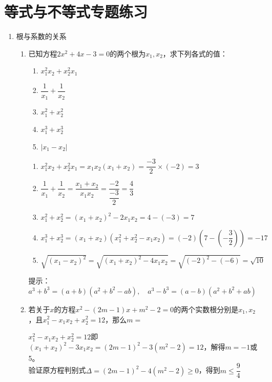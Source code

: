 \chapter*{等式与不等式专题练习}
\begin{enumerate}
    \item 根与系数的关系
    \begin{enumerate}
        \item 已知方程$2x^2+4x-3=0$的两个根为$x_1, x_2$，求下列各式的值：
        \begin{enumerate}
            \item $x_1^2x_2 + x_2^2x_1$
            \item $\dfrac{1}{x_1} + \dfrac{1}{x_2}$
            \item $x_1^2 + x_2^2$
            \item $x_1^3 + x_2^3$
            \item $|x_1 - x_2|$
        \end{enumerate}
        \begin{jieda}
            \begin{enumerate}
                \item $x_1^2x_2 + x_2^2x_1 = x_1x_2(x_1 + x_2) = \dfrac{-3}{2} \times (-2) = 
                3$
                \item $\dfrac{1}{x_1} + \dfrac{1}{x_2} = \dfrac{x_1+x_2}{x_1x_2} = \dfrac{-2}{\dfrac{-3}{2}} = \dfrac{4}{3}$
                \item $x_1^2 + x_2^2 = (x_1+x_2)^2 - 2x_1x_2 = 4 - (-3) = 7$
                \item $x_1^3 + x_2^3 = (x_1 + x_2)(x_1^2 + x_2^2 - x_1x_2) = (-2)(7 - (-\dfrac{3}{2})) = -17$
                \item $\sqrt{(x_1 - x_2)^2} = \sqrt{(x_1 + x_2)^2 - 4x_1x_2} = \sqrt{(-2)^2 - (-6)} = \sqrt{10}$
            \end{enumerate}
            提示：$a^3+b^3 = (a+b)(a^2+b^2-ab), \quad a^3 - b^3 = (a-b)(a^2+b^2+ab)$
        \end{jieda}
        \item 若关于$x$的方程$x^2-(2m-1)x+m^2-2 = 0$的两个实数根分别是$x_1, x_2$，且$x_1^2 - x_1x_2 + x_2^2 = 12$，那么$m = $
        \begin{jieda}
            $x_1^2 - x_1x_2 + x_2^2 = 12$即$(x_1+x_2)^2 - 3x_1x_2 = (2m-1)^2 -3(m^2-2) = 12$，解得$m = -1$或5。\\
            验证原方程判别式$\Delta = (2m-1)^2 - 4(m^2-2) \geq 0$，得到$m \leq \dfrac{9}{4}$ \\

\end{jieda}
\end{enumerate}
\end{enumerate}
